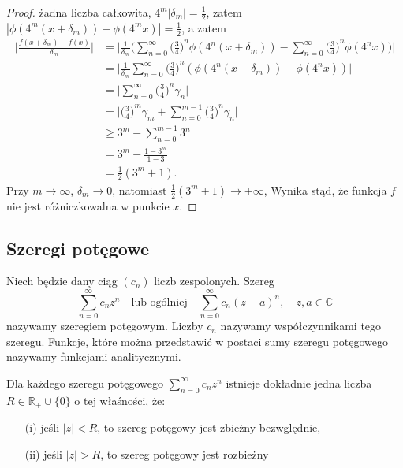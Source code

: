 \documentclass[leqno]{article}
\begin{document}
\begin{justify}
\begin{proof}
    żadna liczba całkowita, $4^m|\delta_m| = \frac{1}{2}$, zatem $|\phi(4^m(x + \delta_m)) - \phi(4^m x)| = \frac{1}{2}$, a zatem
    \begin{align*}
        \Bigg|\frac{f(x + \delta_m) - f(x)}{\delta_m}\Bigg| &= \Bigg| \frac{1}{\delta_m} \Bigg( \sum_{n=0}^{\infty} {\Big( \frac{3}{4}\Big)}^n \phi(4^n(x + \delta_m)) - \sum_{n=0}^{\infty}{\Big( \frac{3}{4}\Big)}^n \phi(4^n x) \Bigg)\Bigg| \\
        &= \Bigg| \frac{1}{\delta_m} \sum_{n=0}^{\infty}{\Big(\frac{3}{4}\Big)}^n(\phi(4^n(x + \delta_m)) - \phi(4^n x))\Bigg| \\
        &= \Bigg| \sum_{n=0}^{\infty}{\Big(\frac{3}{4}\Big)}^n \gamma_n \Bigg| \\ 
        &= \Bigg| {\Big(\frac{3}{4}\Big)}^m \gamma_m + \sum_{n=0}^{m-1}{\Big(\frac{3}{4}\Big)}^n \gamma_n \Bigg| \\
        & \geqslant 3^m - \sum_{n=0}^{m-1}3^n \\
        &= 3^m - \frac{1-3^m}{1-3} \\
        &= \frac{1}{2}(3^m + 1).
    \end{align*}
    Przy $m \to \infty$, $\delta_m \to 0$, natomiast $\frac{1}{2}(3^m + 1) \to +\infty$, Wynika stąd, że funkcja $f$
    nie jest różniczkowalna w punkcie $x$. 
\end{proof}

\newpage
\subsection{Szeregi potęgowe}

\begin{defn}
Niech będzie dany ciąg $(c_n)$ liczb zespolonych. Szereg
\[
    \sum_{n=0}^{\infty}c_n z^n \quad \text{lub ogólniej} \quad \sum_{n=0}^{\infty}c_n {(z - a)}^n, \quad z, a \in \mathbb{C}
\]
nazywamy szeregiem potęgowym. Liczby $c_n$ nazywamy współczynnikami tego szeregu. Funkcje, które można
przedstawić w postaci sumy szeregu potęgowego nazywamy funkcjami analitycznymi.
\end{defn}

\begin{theorem}
{
    Dla każdego szeregu potęgowego $\sum\limits_{n=0}^{\infty}c_n z^n$ istnieje dokładnie jedna liczba $R \in \mathbb{R}_+ \cup \{0\}$ o tej właśności, że:
    \begin{itemize}
        \item [(i)] jeśli $|z| < R$, to szereg potęgowy jest zbieżny bezwględnie, 
        \item [(ii)] jeśli $|z| > R$, to szereg potęgowy jest rozbieżny
    \end{itemize}
}
\end{theorem}


\end{justify}
\end{document}
